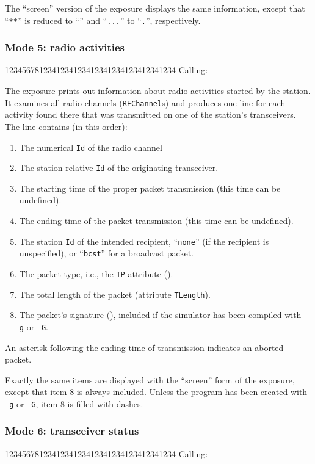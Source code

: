 The ``screen'' version of the exposure displays the same information, except
that ``{\tt ***}'' is reduced to ``{\tt *}'' and ``{\tt ...}'' to ``{\tt .}'',
respectively.

\subsubsection*{Mode 5: radio activities}

{\tt\begin{tabbing}
12345678\=1234\=1234\=1234\=1234\=1234\=1234\=1234\=1234\kill
{\rm Calling:}
\end{tabbing}}

The exposure prints out information about radio activities started
by the station.
It examines all radio channels ({\tt RFChannel}s) and produces one line for
each activity found there that was transmitted on one of the station's
transceivers.
The line contains (in this order):

\begin{enumerate}
\item
The numerical {\tt Id} of the radio channel
\item
The station-relative {\tt Id} of the originating transceiver.
\item
The starting time of the proper packet transmission (this time can be
undefined).
\item
The ending time of the packet transmission (this time can be undefined).
\item
The station {\tt Id} of the intended recipient, ``{\tt none}'' (if the recipient
is unspecified), or ``{\tt bcst}'' for a broadcast packet.
\item
The packet type, i.e., the {\tt TP} attribute ().
\item
The total length of the packet (attribute {\tt TLength}).
\item
The packet's signature (), included if the simulator
has been compiled with {\tt -g} or {\tt -G}.
\end{enumerate}

An asterisk following the ending time of transmission indicates an aborted
packet.

Exactly the same items are displayed with the ``screen''
form of the exposure, except that item 8 is always included.
Unless the program has been created with {\tt -g} or {\tt -G}, item 8 is filled
with dashes.

\subsubsection*{Mode 6: transceiver status}
{\tt\begin{tabbing}
12345678\=1234\=1234\=1234\=1234\=1234\=1234\=1234\=1234\kill
{\rm Calling:}
\end{tabbing}}


